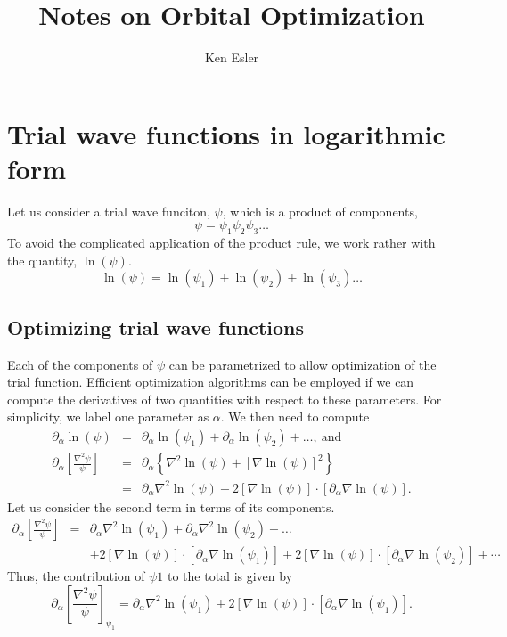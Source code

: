 \documentclass[letterpaper]{article}
\title{Notes on Orbital Optimization}
\author{Ken Esler}
\begin{document}
\maketitle
\newcommand{\vr}{\mathbf{r}}
\newcommand{\Aopt}{\tilde{A}}

\section{Trial wave functions in logarithmic form}
Let us consider a trial wave funciton, $\psi$, which is a product of
components,
\begin{equation}
  \psi = \psi_1 \psi_2 \psi_3 \dots
\end{equation}
To avoid the complicated application of the product rule, we work
rather with the quantity, $\ln(\psi)$.
\begin{equation}
\ln(\psi) = \ln(\psi_1) + \ln(\psi_2) + \ln(\psi_3) \dots
\end{equation}
\subsection{Optimizing trial wave functions}
Each of the components of $\psi$ can be parametrized to allow
optimization of the trial function.  Efficient optimization algorithms
can be employed if we can compute the derivatives of two quantities
with respect to these parameters.  For simplicity, we label one
parameter as $\alpha$.  We then need to compute
\begin{eqnarray}
\partial_\alpha \ln(\psi) & = & \partial_\alpha \ln (\psi_1)
+ \partial_\alpha \ln (\psi_2) + \dots,\ \text{and} \\
\partial_\alpha \left[ \frac{\nabla^2\psi}{\psi}\right] & = &
\partial_\alpha \left\{\nabla^2 \ln(\psi) + \left[\nabla
    \ln(\psi)\right]^2 \right\} \\
& = & \partial_\alpha \nabla^2 \ln(\psi) + 2 \left[\nabla \ln(\psi)
\right]\cdot \left[ \partial_\alpha \nabla \ln(\psi)\right].
\end{eqnarray}
Let us consider the second term in terms of its components.
\begin{eqnarray}
\partial_\alpha \left[ \frac{\nabla^2\psi}{\psi}\right] & = &
 \partial_\alpha \nabla^2\ln(\psi_1) + \partial_\alpha
 \nabla^2\ln(\psi_2)+ \dots \\
& & + 2\left[\nabla \ln(\psi)\right]\cdot
\left[\partial_\alpha \nabla \ln(\psi_1)\right] +
2\left[\nabla \ln(\psi)\right]\cdot
\left[\partial_\alpha \nabla \ln(\psi_2)\right] + \cdots \nonumber
\end{eqnarray}
Thus, the contribution of $\psi1$ to the total is given by
\begin{equation}
\partial_\alpha \left[ \frac{\nabla^2\psi}{\psi}\right]_{\psi_1} =
\partial_\alpha \nabla^2\ln(\psi_1) + 2\left[\nabla \ln(\psi)\right]\cdot
\left[\partial_\alpha \nabla \ln(\psi_1)\right].
\end{equation}
\end{document}
